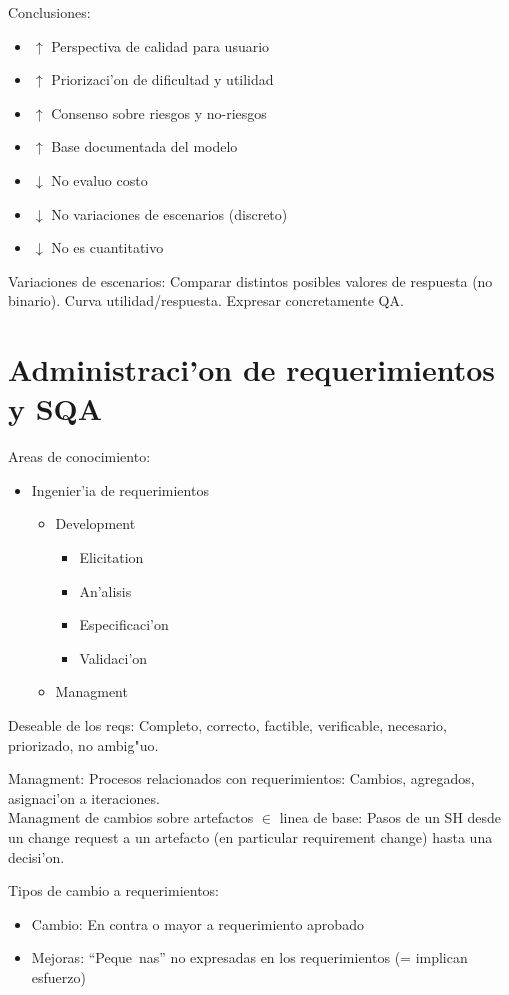 \documentclass[a4paper,spanish]{article}
\newenvironment{items}{
		\vspace*{-\topsep}
		\begin{itemize} 
		\addtolength{\itemsep}{-0.5\baselineskip}
		}{\end{itemize}\vspace*{-\topsep}}
\begin{document}
Conclusiones:
\begin{items}
\item $\uparrow$ Perspectiva de calidad para usuario
\item $\uparrow$ Priorizaci'on de dificultad y utilidad
\item $\uparrow$ Consenso sobre riesgos y no-riesgos
\item $\uparrow$ Base documentada del modelo
\item $\downarrow$ No evaluo costo
\item $\downarrow$ No variaciones de escenarios (discreto)
\item $\downarrow$ No es cuantitativo
\end{items}

Variaciones de escenarios: Comparar distintos posibles valores de respuesta
	(no binario). Curva utilidad/respuesta. Expresar concretamente QA.

\section{Administraci'on de requerimientos y SQA}

Areas de conocimiento: \\
\begin{items}
\item Ingenier'ia de requerimientos
	\begin{items}
	\item Development
		\begin{items}
		\item Elicitation
		\item An'alisis
		\item Especificaci'on
		\item Validaci'on
		\end{items}
	\item Managment
	\end{items}
\end{items}

Deseable de los reqs: Completo, correcto, factible, verificable, necesario, 
	priorizado, no ambig"uo.

Managment: Procesos relacionados con requerimientos: Cambios, agregados, 
	asignaci'on a iteraciones. \\
Managment de cambios sobre artefactos $\in$ linea de base: Pasos de un SH 
	desde un change request a un artefacto (en particular requirement change)
	hasta una decisi'on.
	
Tipos de cambio a requerimientos:
\begin{items}
\item Cambio: En contra o mayor a requerimiento aprobado
\item Mejoras: ``Peque~nas'' no expresadas en los requerimientos (= implican
	esfuerzo)
\end{items}
\end{document}
